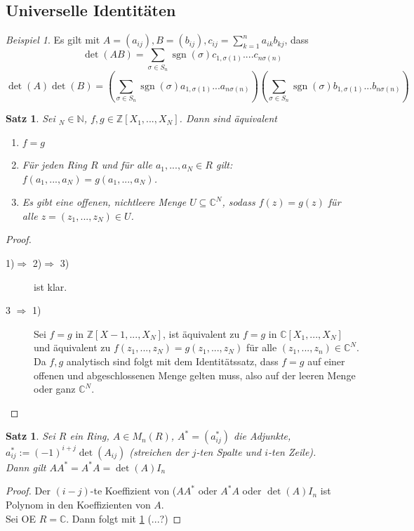 \documentclass[10pt,a4paper]{article}
\newcommand{\N}{\ensuremath{\mathbb{N}}}
\newcommand{\Z}{\ensuremath{\mathbb{Z}}}
\newcommand{\C}{\ensuremath{\mathbb{C}}}
\newcommand{\sgn}{\ensuremath{\operatorname{sgn}}}
\newcounter{thm}[section]
\theoremstyle{definition}
\theoremstyle{plain}
\newtheorem{satz}[thm]{Satz}
\theoremstyle{remark}
\newtheorem{exm}[thm]{Beispiel}
\begin{document}
\subsection{Universelle Identitäten}
\begin{exm}
	Es gilt mit $A=(a_{ij}),B=(b_{ij}),c_{ij}=\sum_{k=1}^{n}a_{ik}b_{kj}$, dass
	\[\det(AB)=\sum_{\sigma\in S_n}\sgn(\sigma) c_{1,\sigma(1)}....c_{n\sigma(n)}\]
	\[\det(A)\det(B)=\left(\sum_{\sigma\in S_n}\sgn(\sigma)a_{1,\sigma(1)}...a_{n\sigma(n)}\right)
	\left(\sum_{\sigma\in S_n}\sgn(\sigma)b_{1,\sigma(1)}...b_{n\sigma(n)}\right)\]
\end{exm}


\begin{satz}\label{1223satz}
	Sei $_N\in\N$, $f,g\in\Z[X_1,...,X_N]$. Dann sind äquivalent
	\begin{enumerate}
		\item $f=g$
		\item Für jeden Ring $R$ und für alle $a_1,...,a_N\in R$ gilt: $f(a_1,...,a_N)=g(a_1,...,a_N)$.
		\item Es gibt eine offenen, nichtleere Menge $U\subseteq\C^N$, sodass $f(z)=g(z)$ für alle $z=(z_1,...,z_N)\in U$.
	\end{enumerate}
\end{satz}
\begin{proof}
	\begin{description}
		\item[1)$\Rightarrow$ 2)$\Rightarrow$ 3)] ist klar.
		\item[3 $\Rightarrow$ 1)] Sei $f=g$ in $\Z[X-1,...,X_N]$, ist äquivalent zu $f=g$ in $\C[X_1,...,X_N]$ und äquivalent zu $f(z_1,...,z_N)=g(z_1,...,z_N)$ für alle $(z_1,...,z_n)\in \C^N$.\\
		Da $f,g$ analytisch sind folgt mit dem Identitätssatz, dass $f=g$ auf einer offenen und abgeschlossenen Menge gelten muss, also auf der leeren Menge oder ganz $\C^N$.
	\end{description}
\end{proof}



\begin{satz}
	Sei $R$ ein Ring, $A\in M_n(R)$, $A^*=(a_{ij}^*)$ die Adjunkte, $a_{ij}^*:=(-1)^{i+j}\det(A_{ij})$ (streichen der $j$-ten Spalte und $i$-ten Zeile).\\
	Dann gilt $AA^*=A^*A=\det(A)I_n$
\end{satz}
\begin{proof}
	Der $(i-j)$-te Koeffizient von ($AA^*$ oder $A^*A$ oder $\det(A)I_n$ ist Polynom in den Koeffizienten von $A$.\\
	Sei OE $R=\C$. Dann folgt mit \ref{1223satz}
	(...?) %
\end{proof}
\end{document}
